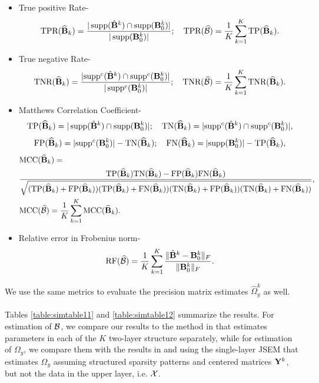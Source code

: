 \begin{itemize}
\item True positive Rate-
%
\[
\text{TPR}(\widehat {{\mathbf{B}}}_k) = \frac{| \operatorname*{supp}(\hat {{\mathbf{B}}}^k) \cap \operatorname*{supp} ({\mathbf{B}}_0^k)|}{| \operatorname*{supp} ({\mathbf{B}}_0^k)|}; \quad
\text{TPR} (\widehat {{\cal{B}}}) = \frac{1}{K} \sum_{k=1}^K \text{TP}(\widehat {{\mathbf{B}}}_k).
\]
\item True negative Rate-
%
\[
\text{TNR}(\widehat {{\mathbf{B}}}_k) = \frac{| {\operatorname*{supp}}^c (\hat {{\mathbf{B}}}^k) \cap {\operatorname*{supp}}^c ({\mathbf{B}}_0^k)|}{| \operatorname*{supp}^c ({\mathbf{B}}_0^k)|}; \quad
\text{TNR} (\widehat {{\cal{B}}}) = \frac{1}{K} \sum_{k=1}^K \text{TNR}(\widehat {{\mathbf{B}}}_k).
\]
%
\item Matthews Correlation Coefficient-
%
$$
\text{TP}(\widehat {{\mathbf{B}}}_k) = | \operatorname*{supp}(\hat {{\mathbf{B}}}^k) \cap \operatorname*{supp} ({\mathbf{B}}_0^k)|; \quad
\text{TN}(\widehat {{\mathbf{B}}}_k) = | {\operatorname*{supp}}^c (\hat {{\mathbf{B}}}^k) \cap {\operatorname*{supp}}^c ({\mathbf{B}}_0^k)|,
$$
$$
\text{FP}(\widehat {{\mathbf{B}}}_k) = | {\operatorname*{supp}}^c ({\mathbf{B}}^k_0) | - \text{TN}(\widehat {{\mathbf{B}}}_k); \quad
\text{FN}(\widehat {{\mathbf{B}}}_k) = | {\operatorname*{supp}} ({\mathbf{B}}^k_0) | - \text{TP}(\widehat {{\mathbf{B}}}_k), $$
\begin{align*}
& \text{MCC} (\widehat {{\mathbf{B}}}_k) = \\
& \frac{ \text{TP}(\widehat {{\mathbf{B}}}_k) \text{TN}(\widehat {{\mathbf{B}}}_k) -
\text{FP}(\widehat {{\mathbf{B}}}_k) \text{FN}(\widehat {{\mathbf{B}}}_k)}
{\sqrt{(\text{TP}(\widehat {{\mathbf{B}}}_k) + \text{FP}(\widehat {{\mathbf{B}}}_k))
(\text{TP}(\widehat {{\mathbf{B}}}_k) + \text{FN}(\widehat {{\mathbf{B}}}_k))
(\text{TN}(\widehat {{\mathbf{B}}}_k) + \text{FP}(\widehat {{\mathbf{B}}}_k))
(\text{TN}(\widehat {{\mathbf{B}}}_k) + \text{FN}(\widehat {{\mathbf{B}}}_k)) }}, \\
& \text{MCC} (\widehat {{\cal{B}}}) = \frac{1}{K} \sum_{k=1}^K \text{MCC}(\widehat {{\mathbf{B}}}_k).
\end{align*}
%
\item Relative error in Frobenius norm-
%
\[
\text{RF} (\widehat {{\cal{B}}}) = \frac{1}{K} \sum_{k=1}^K \frac{\| \hat {{\mathbf{B}}}^k - {\mathbf{B}}_0^k \|_F}{\| {\mathbf{B}}_0^k \|_F}.
\]
%
\end{itemize}
%
We use the same metrics to evaluate the precision matrix estimates $\widehat \Omega_y^k$ as well.

\paragraph{}
Tables \ref{table:simtable11} and \ref{table:simtable12} summarize the results. For estimation of ${\cal{B}}$, we compare our results to the method in \citet{LinEtal16} that estimates parameters in each of the $K$ two-layer structure separately, while for estimation of $\Omega_y$, we compare them with the results in \citet{LinEtal16} and using the single-layer JSEM \citep{MaMichailidis15} that estimates $\Omega_y$ assuming structured sparsity patterns and centered matrices ${\mathbf{Y}}^k$, but not the data in the upper layer, i.e. ${\cal{X}}$.


